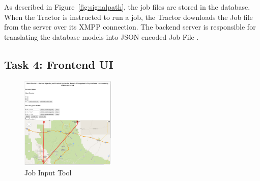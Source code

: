 \documentclass[conference,12pt]{IEEEtran}
\begin{document}
As described in Figure~\ref{fig:signalpath}, the job files are stored in the
database. When the Tractor is instructed to run a job, the Tractor downloads the
Job file from the server over its XMPP connection. The backend server is
responsible for translating the database models into JSON encoded Job
File \autocite{_json_2014}.

\subsection{Task 4: Frontend UI}
\begin{figure}
\centering
\includegraphics[width=0.4\textwidth]{../PlottingV1.png}
\caption{Job Input Tool}
\label{fig:jobinput}
\end{figure}
\end{document}
